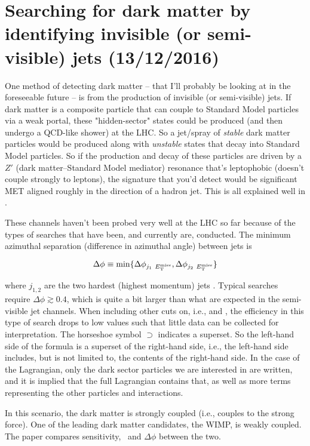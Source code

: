 \newpage
\chapter{Searching for dark matter by identifying invisible (or semi-visible) jets (13/12/2016)}
\label{sec:svjoverview}

One method of detecting dark matter -- that I'll probably be looking at in the foreseeable future -- is from the production of invisible (or semi-visible) jets. If dark matter is a composite particle that can couple to Standard Model particles via a weak portal, these "hidden-sector" states could be produced (and then undergo a QCD-like shower) at the LHC. So a jet/spray of \emph{stable} dark matter particles would be produced along with \emph{unstable} states that decay into Standard Model particles. So if the production and decay of these particles are driven by a $Z'$ (dark matter--Standard Model mediator) resonance that's leptophobic (doesn't couple strongly to leptons), the signature that you'd detect would be significant MET aligned roughly in the direction of a hadron jet. This is all explained well in \cite{Cohen:2015toa}.

These channels haven't been probed very well at the LHC so far because of the types of searches that have been, and currently are, conducted. The minimum azimuthal separation (difference in azimuthal angle) between jets is

\begin{equation}
\Delta\phi \equiv \min \{ \Delta\phi_{j_1 \ E_{\mathrm{T}}^{\text{miss}}}, \Delta\phi_{j_2 \ E_{\mathrm{T}}^{\text{miss}}} \}
\end{equation}

where $j_{1, 2}$ are the two hardest (highest momentum) jets \cite{Cohen:2015toa}. Typical searches require $\Delta\phi \gtrsim 0.4$, which is quite a bit larger than what are expected in the semi-visible jet channels. When including other cuts on, i.e., \etmiss and \alphat, the efficiency in this type of search drops to low values such that little data can be collected for interpretation. The horseshoe symbol $\supset$ indicates a superset. So the left-hand side of the formula is a superset of the right-hand side, i.e., the left-hand side includes, but is not limited to, the contents of the right-hand side. In the case of the Lagrangian, only the dark sector particles we are interested in are written, and it is implied that the full Lagrangian contains that, as well as more terms representing the other particles and interactions.

In this scenario, the dark matter is strongly coupled (i.e., couples to the strong force). One of the leading dark matter candidates, the WIMP, is weakly coupled. The paper compares sensitivity, \etmiss\ and $\Delta\phi$ between the two.

